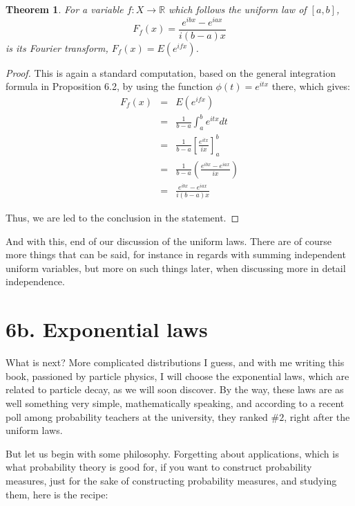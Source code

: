 \documentclass[12pt]{amsbook}
\newtheorem{theorem}{Theorem}[chapter]
\begin{document}
\begin{theorem}
For a variable $f:X\to\mathbb R$ which follows the uniform law of $[a,b]$,
$$F_f(x)=\frac{e^{ibx}-e^{iax}}{i(b-a)x}$$
is its Fourier transform, $F_f(x)=E(e^{ifx})$. 
\end{theorem}

\begin{proof}
This is again a standard computation, based on the general integration formula in Proposition 6.2, by using the function $\phi(t)=e^{itx}$ there, which gives:
\begin{eqnarray*}
F_f(x)
&=&E(e^{ifx})\\
&=&\frac{1}{b-a}\int_a^be^{itx}dt\\
&=&\frac{1}{b-a}\left[\frac{e^{itx}}{ix}\right]_a^b\\
&=&\frac{1}{b-a}\left(\frac{e^{ibx}-e^{iax}}{ix}\right)\\
&=&\frac{e^{ibx}-e^{iax}}{i(b-a)x}
\end{eqnarray*}

Thus, we are led to the conclusion in the statement.
\end{proof}

And with this, end of our discussion of the uniform laws. There are of course more things that can be said, for instance in regards with summing independent uniform variables, but more on such things later, when discussing more in detail independence.

\section*{6b. Exponential laws} 

What is next? More complicated distributions I guess, and with me writing this book, passioned by particle physics, I will choose the exponential laws, which are related to particle decay, as we will soon discover. By the way, these laws are as well something very simple, mathematically speaking, and according to a recent poll among probability teachers at the university, they ranked $\#2$, right after the uniform laws.

\bigskip

But let us begin with some philosophy. Forgetting about applications, which is what probability theory is good for, if you want to construct probability measures, just for the sake of constructing probability measures, and studying them, here is the recipe:
\end{document}
